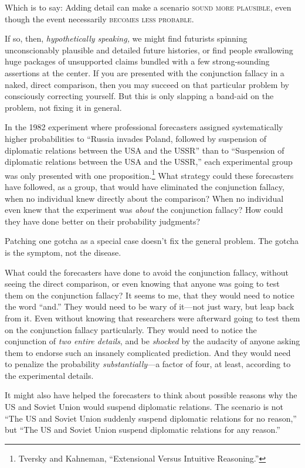 {
 Which is to say: Adding detail can make a scenario \textsc{sound more
plausible}, even though the event necessarily \textsc{becomes less probable}.}

{
 If so, then, \textit{hypothetically speaking,} we might find
futurists spinning unconscionably plausible and detailed future
histories, or find people swallowing huge packages of unsupported
claims bundled with a few strong-sounding assertions at the center. If
you are presented with the conjunction fallacy in a naked, direct
comparison, then you may succeed on that particular problem by
consciously correcting yourself. But this is only slapping a band-aid
on the problem, not fixing it in general.}

{
 In the 1982 experiment where professional forecasters assigned
systematically higher probabilities to ``Russia
invades Poland, followed by suspension of diplomatic relations between
the USA and the USSR'' than to
``Suspension of diplomatic relations between the USA
and the USSR,'' each experimental group was only
presented with one proposition.\footnote{Tversky and Kahneman, ``Extensional Versus
Intuitive Reasoning.''} What strategy could
these forecasters have followed, as a group, that would have eliminated
the conjunction fallacy, when no individual knew directly about the
comparison? When no individual even knew that the experiment was
\textit{about} the conjunction fallacy? How could they have done better
on their probability judgments?}

{
 Patching one gotcha as a special case doesn't fix
the general problem. The gotcha is the symptom, not the disease.}

{
 What could the forecasters have done to avoid the conjunction
fallacy, without seeing the direct comparison, or even knowing that
anyone was going to test them on the conjunction fallacy? It seems to
me, that they would need to notice the word
``and.'' They would need to be wary
of it---not just wary, but leap back from it. Even without knowing that
researchers were afterward going to test them on the conjunction
fallacy particularly. They would need to notice the conjunction of
\textit{two entire details}, and be \textit{shocked} by the audacity of
anyone asking them to endorse such an insanely complicated prediction.
And they would need to penalize the probability
\textit{substantially}{}---a factor of four, at least, according to the
experimental details.}

{
 It might also have helped the forecasters to think about possible
reasons why the US and Soviet Union would suspend diplomatic relations.
The scenario is not ``The US and Soviet Union suddenly
suspend diplomatic relations for no reason,'' but
``The US and Soviet Union suspend diplomatic relations
for any reason.''}

